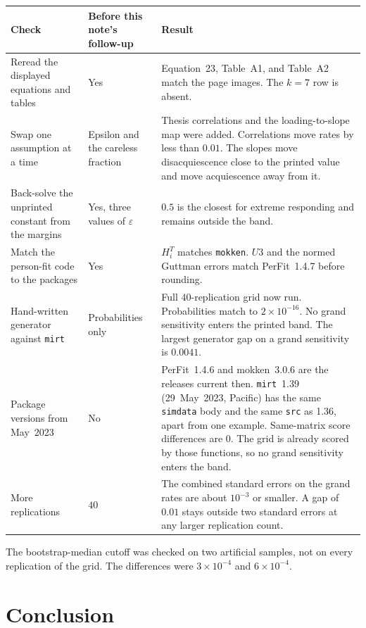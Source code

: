 \documentclass[11pt]{article}
\renewcommand{\arraystretch}{1.3}
\begin{document}
\begin{center}
\small
\renewcommand{\arraystretch}{1.3}
\begin{tabular}{@{}p{}p{}p{}@{}}
\toprule
Check & Before this note's follow-up & Result \\
\midrule
Reread the displayed equations and tables &
Yes &
Equation~23, Table~A1, and Table~A2 match the page images. The \(k=7\) row is absent. \\
Swap one assumption at a time &
Epsilon and the careless fraction &
Thesis correlations and the loading-to-slope map were added. Correlations move rates by less than \(0.01\). The slopes move disacquiescence close to the printed value and move acquiescence away from it. \\
Back-solve the unprinted constant from the margins &
Yes, three values of \(\varepsilon\) &
\(0.5\) is the closest for extreme responding and remains outside the band. \\
Match the person-fit code to the packages &
Yes &
\(H_i^T\) matches \texttt{mokken}. \(U3\) and the normed Guttman errors match PerFit~1.4.7 before rounding. \\
Hand-written generator against \texttt{mirt} &
Probabilities only &
Full \(40\)-replication grid now run. Probabilities match to \(2\times 10^{-16}\). No grand sensitivity enters the printed band. The largest generator gap on a grand sensitivity is \(0.0041\). \\
Package versions from May~2023 &
No &
PerFit~1.4.6 and mokken~3.0.6 are the releases current then. \texttt{mirt}~1.39 (29~May~2023, Pacific) has the same \texttt{simdata} body and the same \texttt{src} as 1.36, apart from one example. Same-matrix score differences are \(0\). The grid is already scored by those functions, so no grand sensitivity enters the band. \\
More replications &
\(40\) &
The combined standard errors on the grand rates are about \(10^{-3}\) or smaller. A gap of \(0.01\) stays outside two standard errors at any larger replication count. \\
\bottomrule
\end{tabular}
\end{center}

The bootstrap-median cutoff was checked on two artificial samples, not
on every replication of the grid.
The differences were \(3\times 10^{-4}\) and \(6\times 10^{-4}\).

\section{Conclusion}
\label{sec:conclusion}
\end{document}

